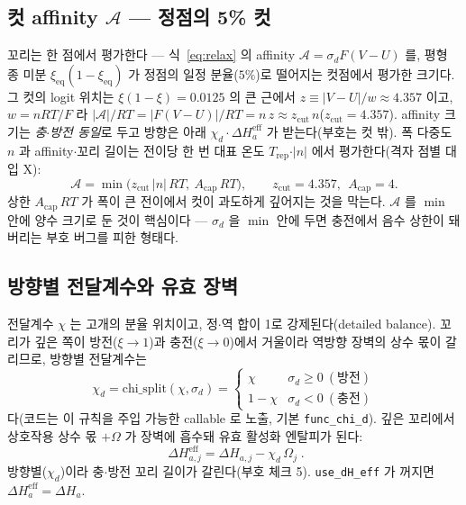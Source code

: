 \documentclass[11pt,a4paper]{article}
\newcommand{\eff}{\mathrm{eff}}
\newcommand{\eq}{\mathrm{eq}}
\newcommand{\rep}{\mathrm{rep}}
\newcommand{\sgn}{\sigma_d}
\begin{document}
\subsection{컷 affinity $\mathcal A$ — 정점의 5\% 컷}
꼬리는 한 점에서 평가한다 — 식~\eqref{eq:relax} 의 affinity $\mathcal A=\sgn F(V-U)$ 를, 평형 종 미분 $\xi_\eq(1-\xi_\eq)$ 가 정점의 일정 분율($5\%$)로 떨어지는 컷점에서 평가한 크기다. 그 컷의 logit 위치는 $\xi(1-\xi)=0.0125$ 의 큰 근에서 $z\equiv|V-U|/w\approx4.357$ 이고, $w=nRT/F$ 라 $|\mathcal A|/RT=|F(V-U)|/RT=n\,z\approx z_{\mathrm{cut}}\,n$($z_{\mathrm{cut}}=4.357$). affinity 크기는 \emph{충$\cdot$방전 동일}로 두고 방향은 아래 $\chi_d\cdot\Delta H_a^\eff$ 가 받는다(부호는 컷 밖). 폭 다중도 $n$ 과 affinity$\cdot$꼬리 길이는 전이당 한 번 대표 온도 $T_\rep$$\cdot$$|n|$ 에서 평가한다(격자 점별 대입 X):
\begin{equation}
\mathcal A=\min\big(z_{\mathrm{cut}}\,|n|\,RT,\ A_{\mathrm{cap}}\,RT\big),\qquad z_{\mathrm{cut}}=4.357,\ \ A_{\mathrm{cap}}=4.
\label{eq:affcut}
\end{equation}
상한 $A_{\mathrm{cap}}\,RT$ 가 폭이 큰 전이에서 컷이 과도하게 깊어지는 것을 막는다. $\mathcal A$ 를 $\min$ 안에 양수 크기로 둔 것이 핵심이다 — $\sgn$ 을 $\min$ 안에 두면 충전에서 음수 상한이 돼 버리는 부호 버그를 피한 형태다.

\subsection{방향별 전달계수와 유효 장벽}
전달계수 $\chi$ 는 고개의 분율 위치이고, 정$\cdot$역 합이 1로 강제된다(detailed balance). 꼬리가 깊은 쪽이 방전($\xi\to1$)과 충전($\xi\to0$)에서 거울이라 역방향 장벽의 상수 몫이 갈리므로, 방향별 전달계수는
\begin{equation}
\chi_d=\mathrm{chi\_split}(\chi,\sgn)=\begin{cases}\chi & \sgn\ge0\ (\text{방전})\\ 1-\chi & \sgn<0\ (\text{충전})\end{cases}
\label{eq:chid}
\end{equation}
다(코드는 이 규칙을 주입 가능한 callable 로 노출, 기본 \texttt{func\_chi\_d}). 깊은 꼬리에서 상호작용 상수 몫 $+\Omega$ 가 장벽에 흡수돼 유효 활성화 엔탈피가 된다:
\begin{equation}
\boxed{\;\Delta H_{a,j}^\eff=\Delta H_{a,j}-\chi_d\,\Omega_j\;.}
\label{eq:dHeff}
\end{equation}
방향별($\chi_d$)이라 충$\cdot$방전 꼬리 길이가 갈린다(부호 체크 5). \texttt{use\_dH\_eff} 가 꺼지면 $\Delta H_a^\eff=\Delta H_a$.
\end{document}
